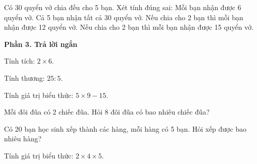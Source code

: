 \begin{ex} %
Có 30 quyển vở chia đều cho 5 bạn. Xét tính đúng sai:
\choiceTF
{\True Mỗi bạn nhận được 6 quyển vở.}
{\True Cả 5 bạn nhận tất cả 30 quyển vở.}
{Nếu chia cho 2 bạn thì mỗi bạn nhận được 12 quyển vở.}
{\True Nếu chia cho 2 bạn thì mỗi bạn nhận được 15 quyển vở.}
\end{ex}

\textbf{Phần 3. Trả lời ngắn}

\begin{ex} %
Tính tích: $2 \times 6$.
\end{ex}

\begin{ex} %
Tính thương: $25 : 5$.
\end{ex}

\begin{ex} %
Tính giá trị biểu thức: $5 \times 9 - 15$.
\end{ex}

\begin{ex} %
Mỗi đôi đũa có 2 chiếc đũa. Hỏi 8 đôi đũa có bao nhiêu chiếc đũa?
\end{ex}

\begin{ex} %
Có 20 bạn học sinh xếp thành các hàng, mỗi hàng có 5 bạn. Hỏi xếp được bao nhiêu hàng?
\end{ex}

\begin{ex} %
Tính giá trị biểu thức: $2 \times 4 \times 5$.
\end{ex}
